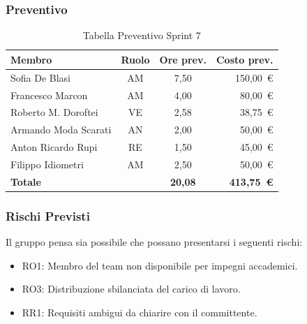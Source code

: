 \subsubsection{Preventivo}
\begin{table}[H]
    \centering
    \renewcommand{\arraystretch}{1.3}
    \begin{tabularx}{\textwidth}{|X|c|c|r|}
        \hline
        \textbf{Membro} & \textbf{Ruolo} & \textbf{Ore prev.} &
        \textbf{Costo prev.} \\
        \hline
        Sofia De Blasi           & AM & 7,50 &  150{,}00~\euro \\
        Francesco Marcon         & AM & 4,00 &  80{,}00~\euro \\
        Roberto M. Doroftei      & VE & 2,58 &  38{,}75~\euro \\
        Armando Moda Scarati     & AN & 2,00 &  50{,}00~\euro \\
        Anton Ricardo Rupi       & RE & 1,50 &  45{,}00~\euro \\
        Filippo Idiometri        & AM & 2,50 &  50{,}00~\euro \\
        \hline
        \textbf{Totale} & & \textbf{20,08} & \textbf{413{,}75~\euro} \\
        \hline
    \end{tabularx}
    \caption{Tabella Preventivo Sprint 7}
\end{table}

\subsubsection{Rischi Previsti}
Il gruppo pensa sia possibile che possano presentarsi i seguenti rischi:
\begin{itemize}
    \item RO1: Membro del team non disponibile per impegni accademici.
    \item RO3: Distribuzione sbilanciata del carico di lavoro.
    \item RR1: Requisiti ambigui da chiarire con il committente.
\end{itemize}

